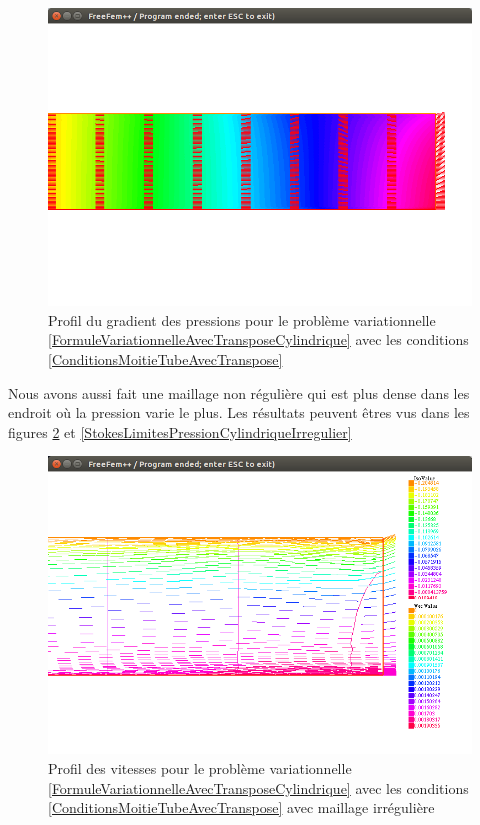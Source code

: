 \documentclass[11pt,a4paper]{article}
\numberwithin{equation}{subsection}
\numberwithin{figure}{subsection}
\begin{document}
\begin{figure}	
\centering
\includegraphics[scale=0.4]{StokesLimitesPressionCylindrique.png}
\caption{Profil du gradient des pressions pour le problème variationnelle \ref{FormuleVariationnelleAvecTransposeCylindrique} avec les conditions \ref{ConditionsMoitieTubeAvecTranspose}}
\label{StokesLimitesPressionCylindrique}
\end{figure}

Nous avons aussi fait une maillage non régulière qui est plus dense dans les endroit où la pression varie le plus. Les résultats peuvent êtres vus dans les figures \ref{StokesLimitesVitessesCylindriqueIrregulier} et \ref{StokesLimitesPressionCylindriqueIrregulier}

\begin{figure}
\centering
\includegraphics[scale=0.4]{StokesLimitesVitessesCylindriqueIrregulier.png}
\caption{Profil des vitesses pour le problème variationnelle \ref{FormuleVariationnelleAvecTransposeCylindrique} avec les conditions \ref{ConditionsMoitieTubeAvecTranspose} avec maillage irrégulière}
\label{StokesLimitesVitessesCylindriqueIrregulier}
\end{figure}
\end{document}
